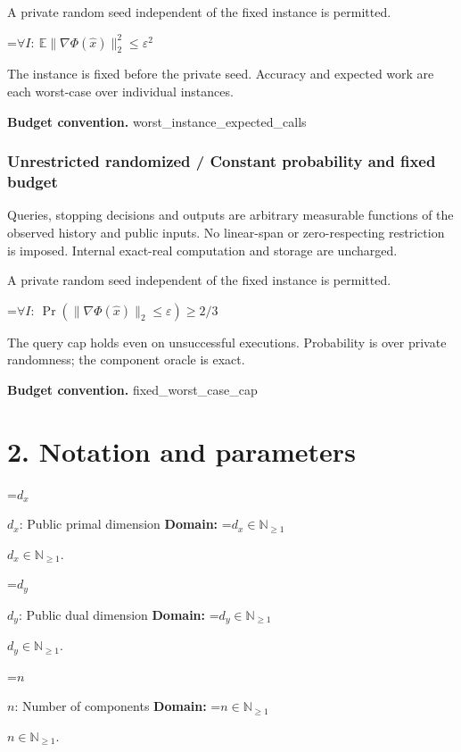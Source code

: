 \documentclass[10pt,a4paper]{article}
\newcommand{\AtlasMath}[1]{\par\begingroup\centering\setbox0=\hbox{$\displaystyle #1$}\ifdim\wd0>1.4\linewidth\typeout{ATLAS WIDE FORMULA: \the\wd0}\fi\ifdim\wd0>\linewidth\resizebox{\linewidth}{!}{\box0}\else\box0\fi\par\endgroup}
\newcommand{\AtlasInlineMath}[1]{\begingroup\setbox0=\hbox{$#1$}\ifdim\wd0>.4\linewidth\endgroup\AtlasMath{#1}\else\endgroup$#1$\fi}
\begin{document}
A private random seed independent of the fixed instance is permitted.




\AtlasMath{\forall I:\ \mathbb E\|\nabla\Phi(\widehat x)\|_2^2\le\varepsilon^2}




The instance is fixed before the private seed. Accuracy and expected work are each worst-case over individual instances.



\textbf{Budget convention.} worst\_instance\_expected\_calls



\subsubsection{Unrestricted randomized / Constant probability and fixed budget}


Queries, stopping decisions and outputs are arbitrary measurable functions of the observed history and public inputs. No linear-span or zero-respecting restriction is imposed. Internal exact-real computation and storage are uncharged.



A private random seed independent of the fixed instance is permitted.




\AtlasMath{\forall I:\ \Pr(\|\nabla\Phi(\widehat x)\|_2\le\varepsilon)\ge2/3}




The query cap holds even on unsuccessful executions. Probability is over private randomness; the component oracle is exact.



\textbf{Budget convention.} fixed\_worst\_case\_cap



\section{2. Notation and parameters}


\AtlasInlineMath{d_x}: Public primal dimension \textbf{Domain:} \AtlasInlineMath{d_x\in\mathbb N_{\ge1}}.



\AtlasInlineMath{d_y}: Public dual dimension \textbf{Domain:} \AtlasInlineMath{d_y\in\mathbb N_{\ge1}}.



\AtlasInlineMath{n}: Number of components \textbf{Domain:} \AtlasInlineMath{n\in\mathbb N_{\ge1}}.
\end{document}
